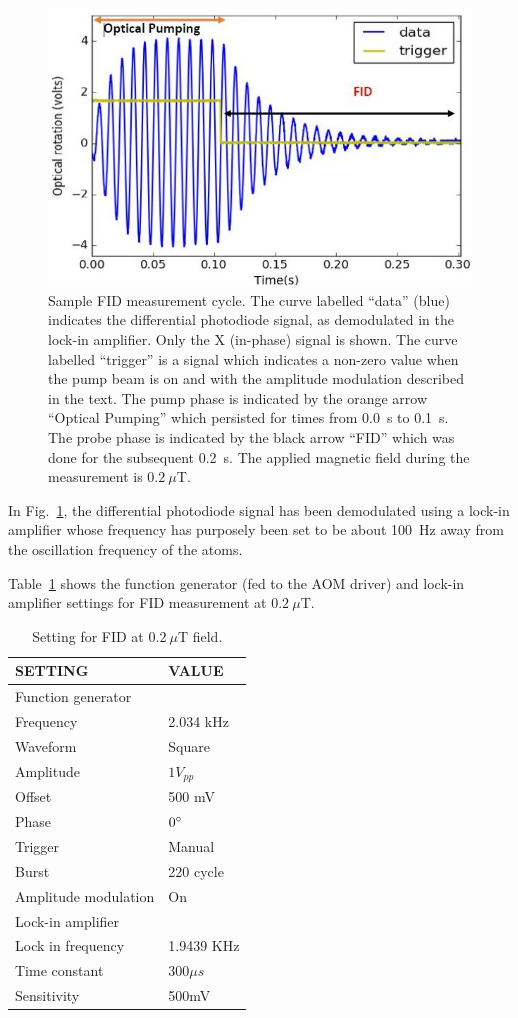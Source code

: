 \begin{figure}%
\centering\includegraphics[width=0.55\linewidth]{figures/Capture2}
\caption{Sample FID measurement cycle.  The curve labelled ``data''
  (blue) indicates the differential photodiode signal, as demodulated
  in the lock-in amplifier.  Only the X (in-phase) signal is shown.
  The curve labelled ``trigger'' is a signal which indicates a
  non-zero value when the pump beam is on and with the amplitude
  modulation described in the text.  The pump phase is indicated by
  the orange arrow ``Optical Pumping'' which persisted for times from
  0.0~s to 0.1~s.  The probe phase is indicated by the black arrow
  ``FID'' which was done for the subsequent 0.2~s. The applied
  magnetic field during the measurement is
  $0.2~\mu$T.\label{fig:FID_example}}
\end{figure}

In Fig.~\ref{fig:FID_example}, the differential photodiode signal has
been demodulated using a lock-in amplifier whose frequency has
purposely been set to be about 100~Hz away from the oscillation
frequency of the atoms.

Table~\ref{tab:FID_setting} shows the function generator (fed to the
AOM driver) and lock-in amplifier settings for FID measurement at
$0.2~\mu$T.

\begin{table}[h]
\centering
\begin{tabular}{|l |l|}
\hline

\textbf{ SETTING}    & \textbf{VALUE} \\
\hline
Function generator &   \\
\hline
Frequency & 2.034 kHz   \\

Waveform    &  Square  \\

Amplitude   &  $1V_{pp}$  \\
Offset  &       500 mV  \\
Phase       &    $0\degree$ \\
Trigger     &   Manual  \\
Burst       &    220 cycle \\
Amplitude modulation & On \\
\hline
Lock-in amplifier &     \\
\hline
Lock in frequency     & 1.9439 KHz \\
Time constant     &  $300\mu s$ \\
Sensitivity      &  500mV  \\
\hline
\end{tabular}
\caption{Setting for FID at $0.2~\mu$T field.\label{tab:FID_setting}}
\end{table}



